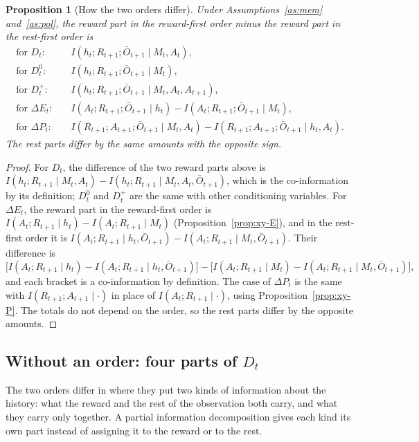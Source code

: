 \documentclass{article}
\newtheorem{proposition}{Proposition}[section]
\theoremstyle{definition}
\theoremstyle{remark}
\newcommand{\dE}{\Delta E}
\newcommand{\dP}{\Delta P}
\newcommand{\Ob}{\bar O}
\begin{document}
\begin{proposition}[How the two orders differ]\label{prop:orderdiff}
Under Assumptions~\ref{as:mem} and~\ref{as:pol}, the reward part in the reward-first order minus the reward part in the rest-first order is
\begin{align*}
\text{for }D_t:&\quad I(h_t;R_{t+1};\Ob_{t+1}\mid M_t,A_t),\\
\text{for }D^0_t:&\quad I(h_t;R_{t+1};\Ob_{t+1}\mid M_t),\\
\text{for }D^+_t:&\quad I(h_t;R_{t+1};\Ob_{t+1}\mid M_t,A_t,A_{t+1}),\\
\text{for }\dE_t:&\quad I(A_t;R_{t+1};\Ob_{t+1}\mid h_t)-I(A_t;R_{t+1};\Ob_{t+1}\mid M_t),\\
\text{for }\dP_t:&\quad I(R_{t+1};A_{t+1};\Ob_{t+1}\mid M_t,A_t)-I(R_{t+1};A_{t+1};\Ob_{t+1}\mid h_t,A_t).
\end{align*}
The rest parts differ by the same amounts with the opposite sign.
\end{proposition}

\begin{proof}
For $D_t$, the difference of the two reward parts above is $I(h_t;R_{t+1}\mid M_t,A_t)-I(h_t;R_{t+1}\mid M_t,A_t,\Ob_{t+1})$, which is the co-information by its definition; $D^0_t$ and $D^+_t$ are the same with other conditioning variables. For $\dE_t$, the reward part in the reward-first order is $I(A_t;R_{t+1}\mid h_t)-I(A_t;R_{t+1}\mid M_t)$ (Proposition~\ref{prop:xy-E}), and in the rest-first order it is $I(A_t;R_{t+1}\mid h_t,\Ob_{t+1})-I(A_t;R_{t+1}\mid M_t,\Ob_{t+1})$. Their difference is
\[
\big[I(A_t;R_{t+1}\mid h_t)-I(A_t;R_{t+1}\mid h_t,\Ob_{t+1})\big]-\big[I(A_t;R_{t+1}\mid M_t)-I(A_t;R_{t+1}\mid M_t,\Ob_{t+1})\big],
\]
and each bracket is a co-information by definition. The case of $\dP_t$ is the same with $I(R_{t+1};A_{t+1}\mid\cdot)$ in place of $I(A_t;R_{t+1}\mid\cdot)$, using Proposition~\ref{prop:xy-P}. The totals do not depend on the order, so the rest parts differ by the opposite amounts.
\end{proof}

\subsection{Without an order: four parts of $D_t$}

The two orders differ in where they put two kinds of information about the history: what the reward and the rest of the observation both carry, and what they carry only together. A partial information decomposition \citep{williams2010nonnegative} gives each kind its own part instead of assigning it to the reward or to the rest.
\end{document}
